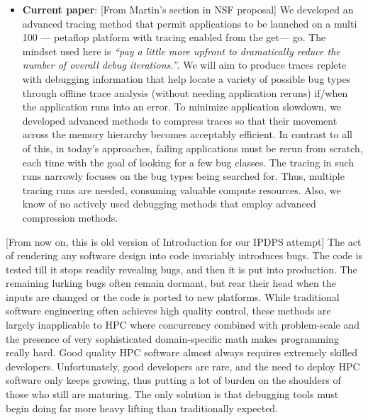 \begin{itemize}
\begin{itemize}
\begin{itemize}
		\item \textbf{Current paper}: [From Martin's section in NSF proposal] We developed an advanced tracing method that permit applications to be launched on a multi 100 --- petaflop platform with tracing enabled from the get--- go. The mindset used here is \textit{“pay a little more upfront to dramatically reduce the number of overall debug iterations.”}. We will aim to produce traces replete with debugging information that help locate a variety of possible bug types through offline trace analysis (without needing application reruns) if/when the application runs into an error. To minimize application slowdown, we  developed advanced methods to compress traces so that their movement across the memory hierarchy becomes acceptably efficient. In contrast to all of this, in today’s approaches, failing applications must be rerun from scratch, each time with the goal of looking for a few bug classes. The tracing in such runs narrowly focuses on the bug types being searched for. Thus, multiple tracing runs are needed, consuming valuable compute resources. Also, we know of no actively used debugging methods that employ advanced compression methods.
		\end{itemize}
	\end{itemize}
\end{itemize}



[From now on, this is old version of Introduction for our IPDPS attempt]
The act of rendering any software design into code invariably
introduces bugs.
%
The code is tested till it stops readily revealing bugs, and then it is
put into production.
%
The remaining lurking bugs often remain dormant, but
rear their head when the inputs are changed or the code
is ported to new platforms.
%
While traditional software engineering often achieves high
quality control, these methods are largely inapplicable to HPC
where concurrency combined with problem-scale and the
presence of very sophisticated domain-specific math
makes programming really hard.
%
Good quality HPC software almost always requires extremely skilled
developers.
%
Unfortunately, good developers are rare, and the need to deploy HPC software
only keeps growing, thus putting a lot of burden on the shoulders of those
who still are maturing.
%
The only solution is that debugging tools must begin doing far more heavy lifting
than traditionally expected.


